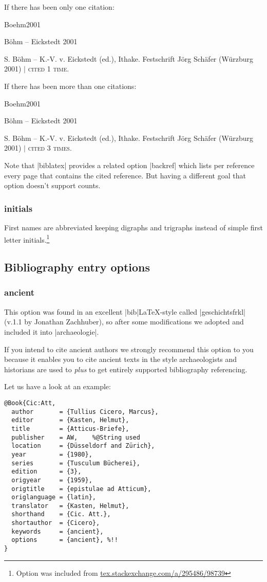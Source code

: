 \documentclass[a4paper,
10pt,
greek,
french,
spanish,
italian,
ngerman,
english
]{ltxdoc}
\begin{document}
If there has been only one citation:
\begin{bibbsp}{Boehm2001}
\parbox[t]{3cm}{Böhm – Eickstedt 2001} \parbox[t]{8cm}{%
S. Böhm – K.-V. v. Eickstedt (ed.), Ithake. Festschrift Jörg Schäfer (Würzburg 2001) $\vert$  {\scshape cited 1 time.}}
\end{bibbsp}

If there has been more than one citations:
\begin{bibbsp}{Boehm2001}
\parbox[t]{3cm}{Böhm – Eickstedt 2001} \parbox[t]{8cm}{%
S. Böhm – K.-V. v. Eickstedt (ed.), Ithake. Festschrift Jörg Schäfer (Würzburg 2001) $\vert$  {\scshape cited 3 times.}}
\end{bibbsp}

Note that |biblatex| provides a related option |backref| which lists per reference every page 
that contains the cited reference. But having a different goal that option doesn't support counts. 
 
\subsubsection{initials}\label{initials}
First names are abbreviated keeping digraphs and trigraphs instead of simple first letter initials.\footnote{Option was included from \href{http://tex.stackexchange.com/a/295486/98739}{tex.stackexchange.com/a/295486/98739}}

\subsection{Bibliography entry options}\label{options-bibentry}
\subsubsection{ancient}\label{ancient}
This option was found in an excellent |bib|\LaTeX-style called  |geschichtsfrkl| (v.1.1 by Jonathan Zachhuber), 
so after some modifications we adopted and included it into |archaeologie|.
 
If you intend to cite ancient authors we strongly recommend this option to you 
because it enables you to cite ancient texts in the style archaeologists and 
historians are used to \emph{plus} to get entirely supported bibliography referencing.

Let us have a look at an example:
\begin{lstlisting}[style=bibentry,label=Cic:Att,caption={{@}Book\{Cic:Att,…\} }]
@Book{Cic:Att,
  author       = {Tullius Cicero, Marcus},
  editor       = {Kasten, Helmut},
  title        = {Atticus-Briefe},
  publisher    = AW, 	%@String used
  location     = {Düsseldorf and Zürich},
  year         = {1980},
  series       = {Tusculum Bücherei},
  edition      = {3},
  origyear     = {1959},
  origtitle    = {epistulae ad Atticum},
  origlanguage = {latin},
  translator   = {Kasten, Helmut},
  shorthand    = {Cic. Att.},
  shortauthor  = {Cicero},
  keywords     = {ancient},
  options      = {ancient}, %!!
}
\end{lstlisting}
\end{document}
